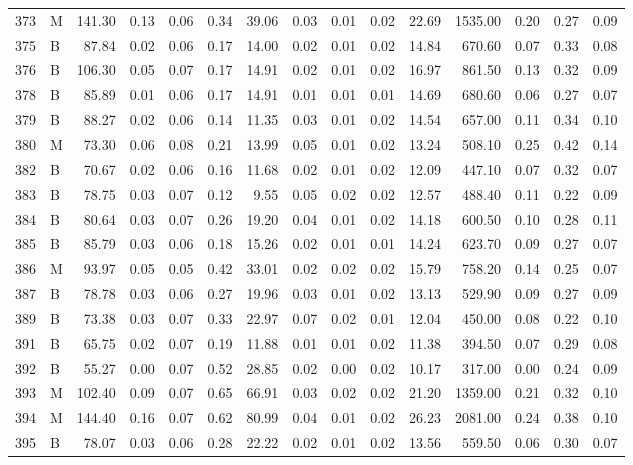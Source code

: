 \begin{table}[ht]
\begin{tabular}{rlrrrrrrrrrrrrr}
  373 & M & 141.30 & 0.13 & 0.06 & 0.34 & 39.06 & 0.03 & 0.01 & 0.02 & 22.69 & 1535.00 & 0.20 & 0.27 & 0.09 \\ 
  375 & B & 87.84 & 0.02 & 0.06 & 0.17 & 14.00 & 0.02 & 0.01 & 0.02 & 14.84 & 670.60 & 0.07 & 0.33 & 0.08 \\ 
  376 & B & 106.30 & 0.05 & 0.07 & 0.17 & 14.91 & 0.02 & 0.01 & 0.02 & 16.97 & 861.50 & 0.13 & 0.32 & 0.09 \\ 
  378 & B & 85.89 & 0.01 & 0.06 & 0.17 & 14.91 & 0.01 & 0.01 & 0.01 & 14.69 & 680.60 & 0.06 & 0.27 & 0.07 \\ 
  379 & B & 88.27 & 0.02 & 0.06 & 0.14 & 11.35 & 0.03 & 0.01 & 0.02 & 14.54 & 657.00 & 0.11 & 0.34 & 0.10 \\ 
  380 & M & 73.30 & 0.06 & 0.08 & 0.21 & 13.99 & 0.05 & 0.01 & 0.02 & 13.24 & 508.10 & 0.25 & 0.42 & 0.14 \\ 
  382 & B & 70.67 & 0.02 & 0.06 & 0.16 & 11.68 & 0.02 & 0.01 & 0.02 & 12.09 & 447.10 & 0.07 & 0.32 & 0.07 \\ 
  383 & B & 78.75 & 0.03 & 0.07 & 0.12 & 9.55 & 0.05 & 0.02 & 0.02 & 12.57 & 488.40 & 0.11 & 0.22 & 0.09 \\ 
  384 & B & 80.64 & 0.03 & 0.07 & 0.26 & 19.20 & 0.04 & 0.01 & 0.02 & 14.18 & 600.50 & 0.10 & 0.28 & 0.11 \\ 
  385 & B & 85.79 & 0.03 & 0.06 & 0.18 & 15.26 & 0.02 & 0.01 & 0.01 & 14.24 & 623.70 & 0.09 & 0.27 & 0.07 \\ 
  386 & M & 93.97 & 0.05 & 0.05 & 0.42 & 33.01 & 0.02 & 0.02 & 0.02 & 15.79 & 758.20 & 0.14 & 0.25 & 0.07 \\ 
  387 & B & 78.78 & 0.03 & 0.06 & 0.27 & 19.96 & 0.03 & 0.01 & 0.02 & 13.13 & 529.90 & 0.09 & 0.27 & 0.09 \\ 
  389 & B & 73.38 & 0.03 & 0.07 & 0.33 & 22.97 & 0.07 & 0.02 & 0.01 & 12.04 & 450.00 & 0.08 & 0.22 & 0.10 \\ 
  391 & B & 65.75 & 0.02 & 0.07 & 0.19 & 11.88 & 0.01 & 0.01 & 0.02 & 11.38 & 394.50 & 0.07 & 0.29 & 0.08 \\ 
  392 & B & 55.27 & 0.00 & 0.07 & 0.52 & 28.85 & 0.02 & 0.00 & 0.02 & 10.17 & 317.00 & 0.00 & 0.24 & 0.09 \\ 
  393 & M & 102.40 & 0.09 & 0.07 & 0.65 & 66.91 & 0.03 & 0.02 & 0.02 & 21.20 & 1359.00 & 0.21 & 0.32 & 0.10 \\ 
  394 & M & 144.40 & 0.16 & 0.07 & 0.62 & 80.99 & 0.04 & 0.01 & 0.02 & 26.23 & 2081.00 & 0.24 & 0.38 & 0.10 \\ 
  395 & B & 78.07 & 0.03 & 0.06 & 0.28 & 22.22 & 0.02 & 0.01 & 0.02 & 13.56 & 559.50 & 0.06 & 0.30 & 0.07 \\ 

\end{tabular}
\end{table}
